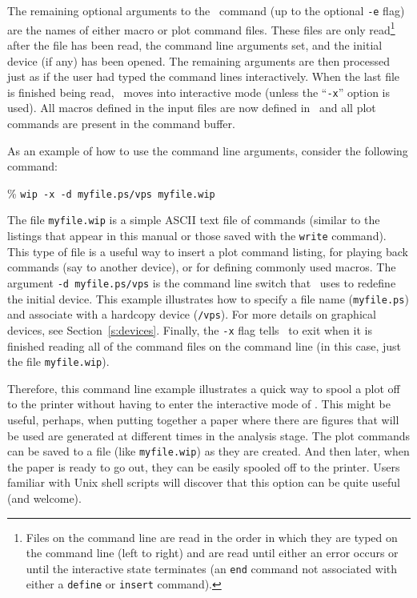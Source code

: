 The remaining optional arguments to the \wip\ command
(up to the optional {\tt -e} flag) are the names of either
macro or plot command files.
These files are only
read\footnote{Files on the command line are read in the order in which
they are typed on the command line (left to right) and are
read until either an error occurs or until the interactive state terminates
(an {\tt end} command not associated with either a
{\tt define} or {\tt insert} command).}
%
%
after the \wipinit{}
file has been read, the command line arguments set, and the initial device
(if any) has been opened.
The remaining arguments are then processed just as if the user had
typed the command lines interactively.
When the last file is finished being read, \wip\ moves into interactive
mode (unless the ``{\tt -x}'' option is used).
All macros defined in the input files are now defined in \wip\ and all plot
commands are present in the command buffer.

As an example of how to use the command line arguments, consider the
following command:
\begin{wiplist}%
  \item [\%] {\tt wip -x -d myfile.ps/vps myfile.wip}
\end{wiplist}
The file {\tt myfile.wip} is a simple ASCII text file of commands
(similar to the listings that appear in this manual
or those saved with the {\tt write} command).
This type of file is a useful way to insert a plot command listing,
for playing back commands (say to another device),
or for defining commonly used macros.
The argument {\tt -d myfile.ps/vps} is the command line
switch that \wip\ uses to redefine the initial device.
This example illustrates how to specify a file name ({\tt myfile.ps})
and associate with a hardcopy device ({\tt /vps}).
For more details on graphical devices, see Section~\ref{s:devices}.
Finally, the {\tt -x} flag tells \wip\ to exit when it is finished
reading all of the command files on the command line
(in this case, just the file {\tt myfile.wip}).

Therefore, this command line example illustrates a quick way to spool a plot off
to the printer without having to enter the interactive mode of \wip.
This might be useful, perhaps, when putting together a paper
where there are figures that will be used are generated at different
times in the analysis stage.
The plot commands can be saved
to a file (like {\tt myfile.wip}) as they are created.
And then later, when the paper is ready to go out,
they can be easily spooled off to the printer.
Users familiar with Unix shell scripts will discover that
this option can be quite useful (and welcome).

